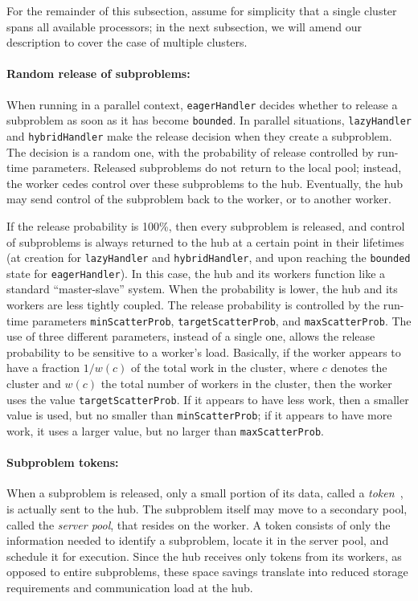 For the remainder of this subsection, assume for simplicity that a
single cluster spans all available processors; in the next subsection,
we will amend our description to cover the case of multiple clusters.

\paragraph{Random release of subproblems:}
When running in a parallel context, \texttt{eagerHandler} decides
whether to release a subproblem as soon as it has become
\texttt{bounded}.  In parallel situations, \texttt{lazyHandler} and
\texttt{hybridHandler} make the release decision when they create a
subproblem.  The decision is a random one, with the probability of
release controlled by run-time parameters.  Released subproblems do
not return to the local pool; instead, the worker cedes control over
these subproblems to the hub.  Eventually, the hub may send control of
the subproblem back to the worker, or to another worker.

If the release probability is 100\%, then every subproblem is
released, and control of subproblems is always returned to the hub at
a certain point in their lifetimes (at creation for \texttt{lazyHandler}
and \texttt{hybridHandler}, and upon reaching the \texttt{bounded} state
for \texttt{eagerHandler}).  In this case, the hub and its workers
function like a standard ``master-slave'' system.  When the
probability is lower, the hub and its workers are less tightly
coupled.  The release probability is controlled by the run-time
parameters \texttt{minScatterProb}, \texttt{targetScatterProb}, and
\texttt{maxScatterProb}.  The use of three different parameters,
instead of a single one, allows the release probability to be
sensitive to a worker's load.  Basically, if the worker appears to
have a fraction $1/w(c)$ of the total work in the cluster, where $c$
denotes the cluster and $w(c)$ the total number of workers in the
cluster, then the worker uses the value \texttt{targetScatterProb}.
If it appears to have less work, then a smaller value is used, but no
smaller than \texttt{minScatterProb}; if it appears to have more work,
it uses a larger value, but no larger than \texttt{maxScatterProb}.

\paragraph{Subproblem tokens:}
When a subproblem is released, only a small portion of its data,
called a \emph{token}~\cite{RRM93,Eck94}, is actually sent to the hub.
The subproblem itself may move to a secondary pool, called the
\emph{server pool}, that resides on the worker.  A token consists of
only the information needed to identify a subproblem, locate it in the
server pool, and schedule it for execution.  Since the hub receives
only tokens from its workers, as opposed to entire subproblems, these
space savings translate into reduced storage requirements and
communication load at the hub.

